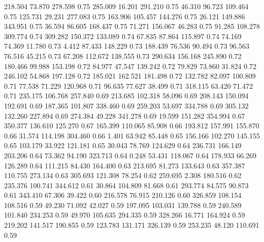  218.504   73.870  278.598         0.75
 285.009   16.201  291.210         0.75
  46.310   96.723  109.464         0.75
 125.731   29.231  277.083         0.75
 163.906  105.457  144.276         0.75
  26.121  149.886  343.951         0.75
  36.594   86.605  168.437         0.75
  71.271  156.067   46.283         0.75
  91.285  108.278  309.774         0.74
 309.282  150.372  133.089         0.74
  67.835   87.864  115.897         0.74
  74.169   74.369   11.780         0.73
   4.412   87.433  148.229         0.73
 188.439   76.536   90.494         0.73
  96.563   76.516   45.215         0.73
  67.208  112.672  138.555         0.73
 290.634  156.168  245.890         0.72
 180.466   99.988  153.198         0.72
  84.977   47.547  139.242         0.72
  79.829   73.860   31.824         0.72
 246.102   54.868  197.128         0.72
 185.021  162.521  181.498         0.72
 132.782   82.097  100.809         0.71
  77.538   71.229  120.968         0.71
  96.635   77.627   38.499         0.71
 318.115   63.420   71.472         0.71
 235.175  106.768  257.840         0.69
 213.685  102.318   58.096         0.69
 208.143  150.094  192.691         0.69
 187.365  101.807  338.460         0.69
 259.203   53.697  334.788         0.69
 305.132  132.260  227.894         0.69
 274.384   49.228  341.278         0.69
  19.599  151.282  354.994         0.67
 350.377  136.610  125.270         0.67
 165.399  110.065   85.908         0.66
 193.812  157.991  155.870         0.66
  31.574  114.198  304.460         0.66
   1.401   63.942   85.448         0.65
 156.166  102.270  145.155         0.65
 103.179   33.922  121.181         0.65
  30.043   78.769  124.629         0.64
 236.731  166.149  203.206         0.64
  73.362   94.190  323.713         0.64
   0.248   53.431  118.067         0.64
 178.933   66.269  126.289         0.64
 111.215   84.430  164.400         0.63
 213.695   81.273  133.643         0.63
 357.387  110.755  273.134         0.63
 305.693  121.308   78.254         0.62
 259.695    2.308  180.516         0.62
 235.376  100.741  344.612         0.61
  30.864  104.809   81.668         0.61
 293.774   84.575   90.873         0.61
 343.410   67.306   39.422         0.60
 216.578   76.915  210.126         0.60
 326.859  108.154  108.516         0.59
  49.230   71.092   42.027         0.59
 197.095  103.031  139.788         0.59
 240.589  101.840  234.253         0.59
  49.970  105.635  294.335         0.59
 328.266   16.771  164.924         0.59
 219.202  141.517  190.855         0.59
 123.783  131.171  326.139         0.59
 253.235   48.120  110.691         0.59
